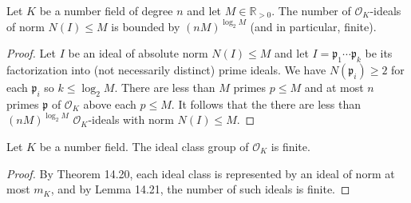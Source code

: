 \begin{lemma}[14.21]
Let $K$ be a number field of degree $n$ and let $M\in\mathbb R_{>0}$. The number of $\mathcal O_K$-ideals of norm $N(I)\le M$ is bounded by $(nM)^{\log_2 M}$ (and in particular, finite).
\end{lemma}
\begin{proof}
Let $I$ be an ideal of absolute norm $N(I)\le M$ and let $I=\mathfrak p_1\cdots\mathfrak p_k$ be its factorization into (not necessarily distinct) prime ideals. We have $N(\mathfrak p_i)\ge2$ for each $\mathfrak p_i$ so $k\le\log_2 M$. There are less than $M$ primes $p\le M$ and at most $n$ primes $\mathfrak p$ of $\mathcal O_K$ above each $p\le M$. It follows that the there are less than $(nM)^{\log_2 M}$ $\mathcal O_K$-ideals with norm $N(I)\le M$.
\end{proof}

\begin{corollary}[14.22]
Let $K$ be a number field. The ideal class group of $\mathcal O_K$ is finite.
\end{corollary}
\begin{proof}
By Theorem 14.20, each ideal class is represented by an ideal of norm at most $m_K$, and by Lemma 14.21, the number of such ideals is finite.
\end{proof}
